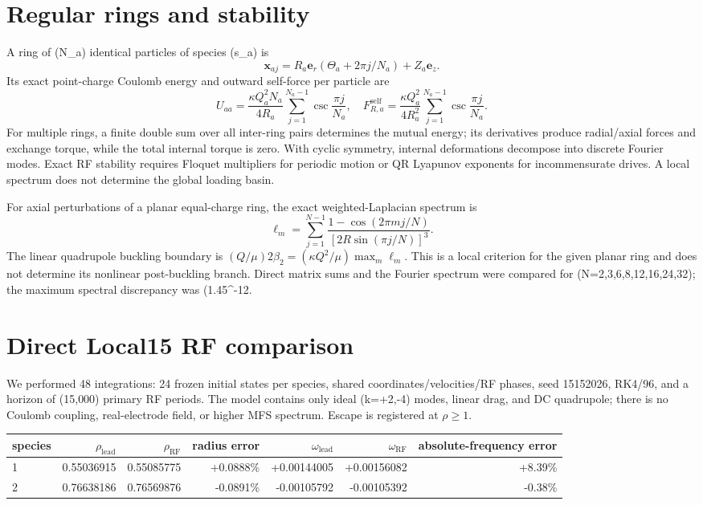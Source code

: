 \documentclass[11pt,a4paper]{article}
\begin{document}
\section{Regular rings and stability}
A ring of (N_a) identical particles of species (s_a) is
\[
\mathbf x_{aj}=R_a\mathbf e_r(\Theta_a+2\pi j/N_a)+Z_a\mathbf e_z.
\]
Its exact point-charge Coulomb energy and outward self-force per particle are
\[
U_{aa}=\frac{\kappa Q_a^2N_a}{4R_a}\sum_{j=1}^{N_a-1}\csc\frac{\pi j}{N_a},\quad
F^{\mathrm{self}}_{R,a}=\frac{\kappa Q_a^2}{4R_a^2}\sum_{j=1}^{N_a-1}\csc\frac{\pi j}{N_a}.
\]
For multiple rings, a finite double sum over all inter-ring pairs determines the mutual energy; its derivatives produce radial/axial forces and exchange torque, while the total internal torque is zero. With cyclic symmetry, internal deformations decompose into discrete Fourier modes. Exact RF stability requires Floquet multipliers for periodic motion or QR Lyapunov exponents for incommensurate drives. A local spectrum does not determine the global loading basin.

For axial perturbations of a planar equal-charge ring, the exact weighted-Laplacian spectrum is
\[
\ell_m=\sum_{j=1}^{N-1}\frac{1-\cos(2\pi mj/N)}{[2R\sin(\pi j/N)]^3}.
\]
The linear quadrupole buckling boundary is \((Q/\mu)2\beta_2=(\kappa Q^2/\mu)\max_m\ell_m\). This is a local criterion for the given planar ring and does not determine its nonlinear post-buckling branch. Direct matrix sums and the Fourier spectrum were compared for (N=2,3,6,8,12,16,24,32); the maximum spectral discrepancy was (1.45^{-12}\).

\section{Direct Local15 RF comparison}
We performed 48 integrations: 24 frozen initial states per species, shared coordinates/velocities/RF phases, seed 15152026, RK4/96, and a horizon of (15{,}000) primary RF periods. The model contains only ideal (k=+2,-4) modes, linear drag, and DC quadrupole; there is no Coulomb coupling, real-electrode field, or higher MFS spectrum. Escape is registered at \(\rho\ge1\).

\begin{center}
\begin{tabular}{lrrrrrr}
\toprule
species & \(\rho_\mathrm{lead}\) & \(\rho_\mathrm{RF}\) & radius error & \(\omega_\mathrm{lead}\) & \(\omega_\mathrm{RF}\) & absolute-frequency error\\
\midrule
1 & 0.55036915 & 0.55085775 & +0.0888\% & +0.00144005 & +0.00156082 & +8.39\%\\
2 & 0.76638186 & 0.76569876 & -0.0891\% & -0.00105792 & -0.00105392 & -0.38\%\\
\bottomrule
\end{tabular}
\end{center}
\end{document}
